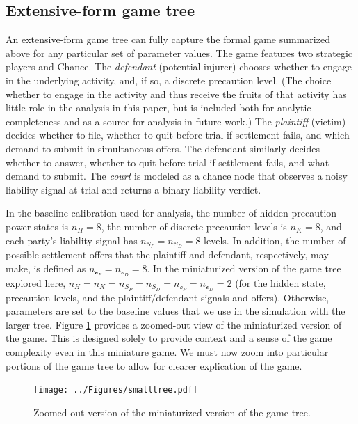 \documentclass{article}
\begin{document}
\subsection{Extensive-form game tree}

An extensive-form game tree can fully capture the formal game summarized above for any particular set of parameter values. The game features two strategic players and Chance. The \emph{defendant} (potential injurer) chooses whether to engage in the underlying activity, and, if so, a discrete precaution level. (The choice whether to engage in the activity and thus receive the fruits of that activity has little role in the analysis in this paper, but is included both for analytic completeness and as a source for analysis in future work.) The \emph{plaintiff} (victim) decides whether to file, whether to quit before trial if settlement fails, and which demand to submit in simultaneous offers. The defendant similarly decides whether to answer, whether to quit before trial if settlement fails, and what demand to submit. The \emph{court} is modeled as a chance node that observes a noisy liability signal at trial and returns a binary liability verdict.

In the baseline calibration used for analysis, the number of hidden precaution-power states is $n_H=8$, the number of discrete precaution levels is $n_K=8$, and each party’s liability signal has $n_{S_P}=n_{S_D}=8$ levels. In addition, the number of possible settlement offers that the plaintiff and defendant, respectively, may make, is defined as $n_{\mathcal{o}_P} = n_{\mathcal{o}_D} = 8$. In the miniaturized version of the game tree explored here, $n_H = n_K = n_{S_P} = n_{S_D} = n_{\mathcal{o}_P} = n_{\mathcal{o}_D} = 2$ (for the hidden state, precaution levels, and the plaintiff/defendant signals and offers). Otherwise, parameters are set to the baseline values that we use in the simulation with the larger tree. Figure \ref{fig:smalltree.pdf} provides a zoomed-out view of the miniaturized version of the game. This is designed solely to provide context and a sense of the game complexity even in this miniature game. We must now zoom into particular portions of the game tree to allow for clearer explication of the game.

 \begin{figure}[t]
  \centering
  \texttt{[image: ../Figures/smalltree.pdf]}
  \caption{Zoomed out version of the miniaturized version of the game tree.}
  \label{fig:smalltree.pdf}
\end{figure}
\end{document}
